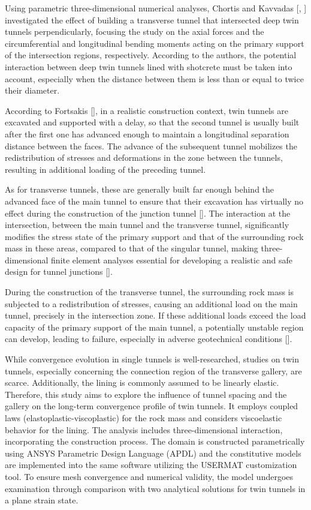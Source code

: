 \documentclass[a4paper,fleqn]{cas-sc}
\begin{document}
Using parametric three-dimensional numerical analyses, Chortis and Kavvadas [, ] investigated the effect of building a transverse tunnel that intersected deep twin tunnels perpendicularly, focusing the study on the axial forces and the circumferential and longitudinal bending moments acting on the primary support of the intersection regions, respectively. According to the authors, the potential interaction between deep twin tunnels lined with shotcrete must be taken into account, especially when the distance between them is less than or equal to twice their diameter.

According to Fortsakis [], in a realistic construction context, twin tunnels are excavated and supported with a delay, so that the second tunnel is usually built after the first one has advanced enough to maintain a longitudinal separation distance between the faces. The advance of the subsequent tunnel mobilizes the redistribution of stresses and deformations in the zone between the tunnels, resulting in additional loading of the preceding tunnel.

As for transverse tunnels, these are generally built far enough behind the advanced face of the main tunnel to ensure that their excavation has virtually no effect during the construction of the junction tunnel []. The interaction at the intersection, between the main tunnel and the transverse tunnel, significantly modifies the stress state of the primary support and that of the surrounding rock mass in these areas, compared to that of the singular tunnel, making three-dimensional finite element analyses essential for developing a realistic and safe design for tunnel junctions [].

During the construction of the transverse tunnel, the surrounding rock mass is subjected to a redistribution of stresses, causing an additional load on the main tunnel, precisely in the intersection zone. If these additional loads exceed the load capacity of the primary support of the main tunnel, a potentially unstable region can develop, leading to failure, especially in adverse geotechnical conditions [].

While convergence evolution in single tunnels is well-researched, studies on twin tunnels, especially concerning the connection region of the transverse gallery, are scarce. Additionally, the lining is commonly assumed to be linearly elastic. Therefore, this study aims to explore the influence of tunnel spacing and the gallery on the long-term convergence profile of twin tunnels. It employs coupled laws (elastoplastic-viscoplastic) for the rock mass and considers viscoelastic behavior for the lining. The analysis includes three-dimensional interaction, incorporating the construction process. The domain is constructed parametrically using ANSYS Parametric Design Language (APDL) and the constitutive models are implemented into the same software utilizing the USERMAT customization tool. To ensure mesh convergence and numerical validity, the model undergoes examination through comparison with two analytical solutions for twin tunnels in a plane strain state.
\end{document}
